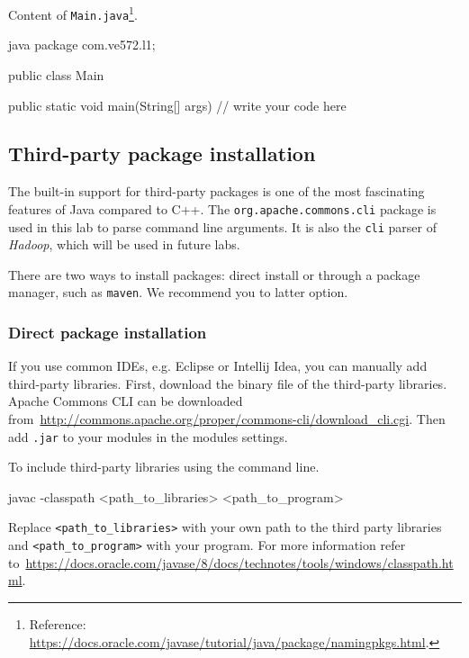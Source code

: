 \documentclass[11pt,a4paper]{article}
\begin{document}
\medskip

Content of \texttt{Main.java}\footnote{Reference: \url{https://docs.oracle.com/javase/tutorial/java/package/namingpkgs.html}.}.

\begin{inlinecbox}{java}
package com.ve572.l1;

public class Main {

    public static void main(String[] args) {
        // write your code here
    }
}
\end{inlinecbox}

\subsection{Third-party package installation}

The built-in support for third-party packages is one of the most fascinating features of Java compared to C++. The \texttt{org.apache.commons.cli} package is used in this lab to parse command line arguments. It is also the {\tt cli} parser of  \textit{Hadoop}, which will be used in future labs.

There are two ways to install packages: direct install or through a package manager, such as \texttt{maven}. We recommend you to latter option.

\subsubsection{Direct package installation}

If you use common IDEs, e.g. Eclipse or Intellij Idea, you can manually add third-party libraries. First, download the binary file of the third-party libraries. Apache Commons CLI can be downloaded from~\url{http://commons.apache.org/proper/commons-cli/download_cli.cgi}. Then add {\tt *.jar} to your modules in the modules settings. 

To include third-party libraries using the command line.
\begin{shbox}
javac -classpath <path_to_libraries> <path_to_program>
\end{shbox}

Replace {\tt <path\_to\_libraries>} with your own path to the third party libraries and {\tt <path\_to\_program>} with your program. For more information refer to~\url{https://docs.oracle.com/javase/8/docs/technotes/tools/windows/classpath.html}.
\end{document}
